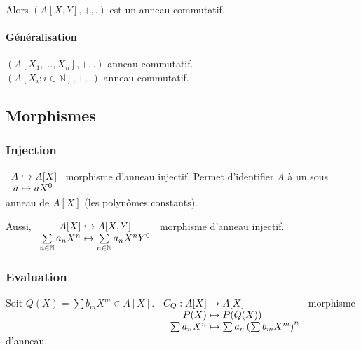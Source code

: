 \documentclass[reqno,a4paper,10pt]{report}
\newcommand{\IN}{\ensuremath{\mathbb{N}}\xspace} %
\newcommand{\inj}{\hookrightarrow}
\begin{document}
Alors $\left( A[X,Y], +, . \right)$ est un anneau commutatif.

\paragraph{Généralisation} $(A[X_1, \dots, X_n], +, .)$ anneau commutatif.\\
$(A[X_i; i\in \IN], +, .)$ anneau commutatif.

\subsection{Morphismes}
\subsubsection{Injection}
$\begin{array}[t]{r@{\ }l}
  A  &\inj A[X]\\
  a &\mapsto a X^0
\end{array}$
morphisme d'anneau injectif. Permet d'identifier $A$ à un sous anneau de
$A[X]$ (les polynômes constants).

Aussi, $
\begin{array}[t]{r@{\ }l}
  A[X] &\inj A[X,Y]\\
  \sum\limits_{n\in \IN} a_n X^n &\mapsto  \sum\limits_{n \in \IN} a_n
  X^n Y^0
\end{array}$ morphisme d'anneau injectif.

\subsubsection{Evaluation}
Soit $Q(X) = \sum b_m X^m \in A[X]$.
$\begin{array}[t]{r@{\ }l}
  C_Q : A[X] &\to A[X]\\
  P(X) &\mapsto P(Q(X))\\
  \sum a_n X^n &\mapsto \sum a_n \left( \sum b_m X^m \right)^n
\end{array}$ morphisme d'anneau.
\end{document}
